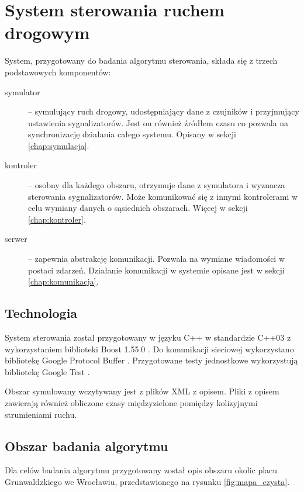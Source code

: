 \chapter{System sterowania ruchem drogowym}
System, przygotowany do badania algorytmu sterowania, składa się z trzech podstawowych komponentów:
\begin{description}
	\item[symulator] --
		symulujący ruch drogowy, udostępniający dane z czujników i przyjmujący ustawienia sygnalizatorów.
		Jest on również źródłem czasu co pozwala na synchronizację działania całego systemu. Opisany w sekcji \ref{chap:symulacja}.
	\item[kontroler] --
		osobny dla każdego obszaru, otrzymuje dane z symulatora i wyznacza sterowania sygnalizatorów.
		Może komunikować się z innymi kontrolerami w celu wymiany danych o sąsiednich obszarach. Więcej w sekcji \ref{chap:kontroler}.
	\item[serwer] --
		zapewnia abstrakcję komunikacji. Pozwala na wymiane wiadomości w postaci zdarzeń.
		Działanie komunikacji w systemie opisane jest w sekcji \ref{chap:komunikacja}.
\end{description}

\section{Technologia}
System sterowania został przygotowany w języku C++ w standardzie C++03 z wykorzystaniem biblioteki Boost 1.55.0 \cite{boost}. Do komunikacji sieciowej wykorzystano bibliotekę Google Protocol Buffer \cite{protobuf}. Przygotowane testy jednostkowe wykorzystują bibliotekę Google Test \cite{gtest}.

Obszar symulowany wczytywany jest z plików XML z opisem. Pliki z opisem zawierają również obliczone czasy międzyzielone pomiędzy kolizyjnymi strumieniami ruchu.

\section{Obszar badania algorytmu}
Dla celów badania algorytmu przygotowany został opis obszaru okolic placu Grunwaldzkiego we Wrocławiu, przedstawionego na rysunku \ref{fig:mapa_czysta}.

